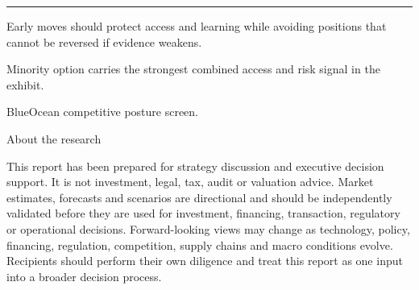 \documentclass[10pt,a4paper]{article}
\begin{document}
\vspace{3pt}\noindent\begin{minipage}[t]{0.58\linewidth}
\textcolor{BOGreen}{\rule{24mm}{0.6pt}}\par\vspace{3pt}
{\footnotesize\color{BOText} Early moves should protect access and learning while avoiding positions that cannot be reversed if evidence weakens.}\par\vspace{2pt}
{\footnotesize\color{BOText} Minority option carries the strongest combined access and risk signal in the exhibit.}\par\vspace{2pt}
\end{minipage}\hfill\begin{minipage}[t]{0.36\linewidth}
\par
\end{minipage}\par\vspace{2pt}
\par
{\scriptsize\color{BOMuted} BlueOcean competitive posture screen.}\par

\clearpage
{\sffamily\fontsize{20}{25}\selectfont\color{BONavy} About the research}\par\vspace{6pt}
\vspace{2pt}{\color{BOBright}\rule{\linewidth}{1pt}}\vspace{5pt}
{\footnotesize\color{BOMuted} This report has been prepared for strategy discussion and executive decision support. It is not investment, legal, tax, audit or valuation advice. Market estimates, forecasts and scenarios are directional and should be independently validated before they are used for investment, financing, transaction, regulatory or operational decisions. Forward-looking views may change as technology, policy, financing, regulation, competition, supply chains and macro conditions evolve. Recipients should perform their own diligence and treat this report as one input into a broader decision process.}
\end{document}
